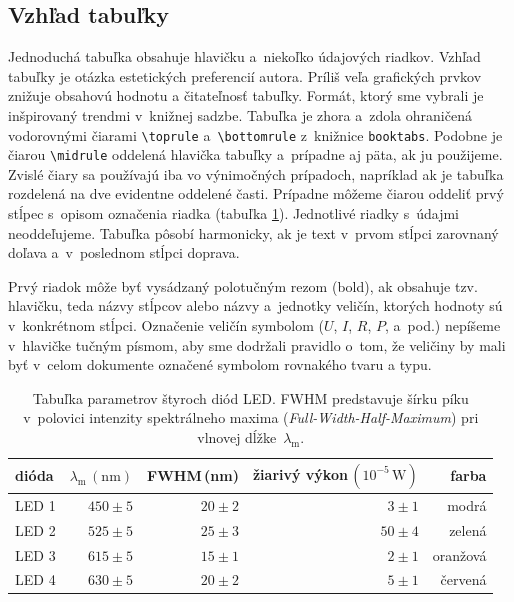 \subsection{Vzhľad tabuľky}
Jednoduchá tabuľka obsahuje hlavičku a~niekoľko
údajových riadkov.
Vzhľad tabuľky je otázka estetických preferencií autora.
Príliš veľa grafických prvkov znižuje obsahovú hodnotu a čitateľnosť tabuľky.
Formát, ktorý sme vybrali je inšpirovaný trendmi
v~knižnej sadzbe.
Tabuľka je zhora a~zdola ohraničená vodorovnými čiarami
\verb|\toprule| a~\verb|\bottomrule| z~knižnice \verb|booktabs|.
Podobne je čiarou \verb|\midrule| oddelená hlavička tabuľky
a~prípadne aj päta, ak ju použijeme.
Zvislé čiary sa používajú iba vo výnimočných prípadoch,
napríklad ak je tabuľka rozdelená na
dve evidentne oddelené časti.
Prípadne môžeme čiarou oddeliť prvý stĺpec s~opisom označenia riadka (tabuľka \ref{tab:LED}).
Jednotlivé riadky s~údajmi neoddeľujeme.
Tabuľka pôsobí harmonicky,
ak je text v~prvom stĺpci zarovnaný doľava
a~v~poslednom stĺpci doprava.

Prvý riadok môže byť vysádzaný polotučným
rezom (bold),
ak obsahuje tzv. hlavičku, teda názvy stĺpcov alebo názvy
a~jednotky veličín, ktorých hodnoty sú v~konkrétnom stĺpci.
Označenie veličín symbolom ($U$, $I$, $R$, $P$, a~pod.)
nepíšeme v~hlavičke tučným písmom,
aby sme dodržali pravidlo o~tom,
že veličiny by mali byť v~celom dokumente označené symbolom
rovnakého tvaru a typu.

\begin{table}[h!]
  \caption{Tabuľka parametrov štyroch diód LED.
  FWHM predstavuje šírku píku v~polovici intenzity
  spektrálneho maxima (\foreignlanguage{english}{\emph{Full-Width-Half-Maximum}}) pri vlnovej dĺžke~$\lambda_\mathrm m$.}
  \label{tab:LED}
  \centering
  \begin{tabular}{@{}l|rrrr@{}}
    \toprule
    dióda & $\lambda_\mathrm m\,(\mathrm{nm})$ & FWHM\,(nm) & žiarivý výkon\,$(10^{-5}\,\mathrm W)$ & farba \\
    \midrule
    LED 1 & $450 \pm 5$ & $20\pm2$ & $3\pm1$ & modrá\\
    LED 2 & $525 \pm 5$ & $25\pm3$ & $50\pm4$ & zelená\\
    LED 3 & $615 \pm 5$ & $15\pm1$ & $2\pm1$ & oranžová\\
    LED 4 & $630 \pm 5$ & $20\pm2$ & $5\pm1$ & červená\\
    \bottomrule
  \end{tabular}
\end{table}

